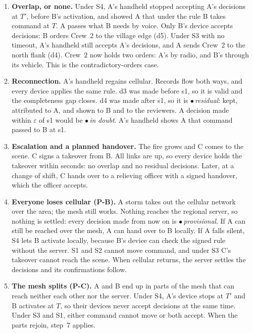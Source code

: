 \documentclass[11pt,a4paper]{article}
\newcommand{\status}[2]{\textcolor{#1}{$\bullet$}\,\textit{#2}}
\newcommand{\sProv}{\status{prov}{provisional}}
\newcommand{\sResid}{\status{resid}{residual}}
\newcommand{\sDoubt}{\status{doubt}{in doubt}}
\begin{document}
\begin{enumerate}[label=\textbf{\arabic*.}, leftmargin=1.6em]
        journal later. If A does not answer, C signs a takeover appointing B (s1), which
        reaches V2 over cellular. Under S4, nobody acts: when B's device has heard nothing
        from A's for $T$, it offers B the activation, and B signs it (s1).
  \item \textbf{Overlap, or none.} Under S4, A's handheld stopped accepting A's decisions at
        $T'$, before B's activation, and showed A that under the rule B takes command at
        $T$. A passes what B needs by voice. Only B's device accepts decisions: B orders
        Crew~2 to the village edge (d5). Under S3 with no timeout, A's handheld still accepts
        A's decisions, and A sends Crew~2 to the north flank (d4). Crew~2 now holds two
        orders: A's by radio, and B's through its vehicle. This is the contradictory-orders
        case.
  \item \textbf{Reconnection.} A's handheld regains cellular. Records flow both ways, and
        every device applies the same rule. d3 was made before s1, so it is valid and the
        completeness gap closes. d4 was made after s1, so it is \sResid: kept, attributed to
        A, and shown to B and to the reviewers. A decision made within $\varepsilon$ of s1
        would be \sDoubt. A's handheld shows A that command passed to B at s1.
  \item \textbf{Escalation and a planned handover.} The fire grows and C comes to the scene.
        C signs a takeover from B. All links are up, so every device holds the takeover
        within seconds: no overlap and no residual decisions. Later, at a change of shift, C
        hands over to a relieving officer with a signed handover, which the officer accepts.
  \item \textbf{Everyone loses cellular (P-B).} A storm takes out the cellular network over
        the area; the mesh still works. Nothing reaches the regional server, so nothing is
        settled: every decision made from now on is \sProv. If A can still be reached over
        the mesh, A can hand over to B locally. If A falls silent, S4 lets B activate
        locally, because B's device can check the signed rule without the server. S1 and S2
        cannot move command, and under S3 C's takeover cannot reach the scene. When cellular
        returns, the server settles the decisions and its confirmations follow.
  \item \textbf{The mesh splits (P-C).} A and B end up in parts of the mesh that can reach
        neither each other nor the server. Under S4, A's device stops at $T'$ and B
        activates at $T$, so their devices never accept decisions at the same time. Under S3
        and S1, either command cannot move or both accept. When the parts rejoin, step~7
        applies.
\end{enumerate}
\end{document}
